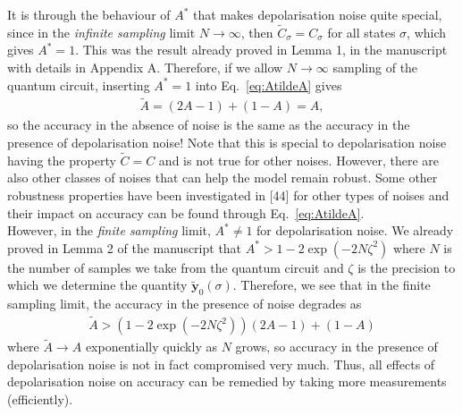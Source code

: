 \documentclass[onecolumn,prx, superscriptaddress,longbibliography,margin=1mm 11pt]{revtex4-2}
\renewcommand{\mathbf}[1]{\boldsymbol{#1}}
\begin{document}
It is through the behaviour of $A^*$ that makes depolarisation noise quite special,  since in the \textit{infinite sampling} limit $N \rightarrow \infty$,  then $\tilde{C}_{\sigma}=C_{\sigma}$ for all states $\sigma$,  which gives $A^*=1$.  This was the result already proved in Lemma 1, in the manuscript  with details in Appendix A.  Therefore,  if we allow $N \rightarrow \infty$ sampling of the quantum circuit,  inserting $A^*=1$ into Eq.~\eqref{eq:AtildeA} gives
\begin{align}
\tilde{A}=(2A-1)+(1-A)=A,
\end{align}
so the accuracy in the absence of noise is the same as the accuracy in the presence of depolarisation noise! Note that this is special to depolarisation noise having the property $\tilde{C}=C$ and is not true for other noises.  However,  there are also other classes of noises that can help the model remain robust.  Some other robustness properties have been investigated in [44] for other types of noises and their impact on accuracy can be found through Eq.~\eqref{eq:AtildeA}. \\

However,  in the \textit{finite sampling} limit,  $A^* \neq 1$ for depolarisation noise.  We already proved in Lemma  2 of the manuscript that $A^*>1-2\exp(-2N \zeta^2)$ where $N$ is the number of samples we take from the quantum circuit and $\zeta$ is the precision to which we determine the quantity $\mathbf{\tilde{y}}_0(\sigma)$.  Therefore,  we see that in the finite sampling limit,  the accuracy in the presence of noise degrades as 
\begin{align}
\tilde{A}>(1-2\exp(-2N \zeta^2))(2A-1)+(1-A)
\end{align}
where $\tilde{A} \rightarrow A$ exponentially quickly as $N$ grows,  so accuracy in the presence of depolarisation noise is not in fact compromised very much. Thus,  all effects of depolarisation noise on accuracy can be remedied by taking more measurements (efficiently). 
\end{document}
